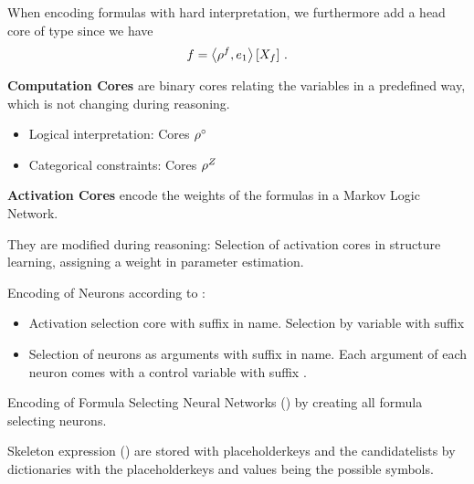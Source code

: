 When encoding formulas with hard interpretation, we furthermore add a head core of type  since we have
 	\[ {f} = \left\langle \rho^{f},e_1\right\rangle \left[ X_{f} \right] \, . \]




\textbf{Computation Cores} are binary cores relating the variables in a predefined way, which is not changing during reasoning.
\begin{itemize}
	\item Logical interpretation: Cores $\rho^{\circ}$ 
	\item Categorical constraints: Cores $\rho^{Z}$
\end{itemize}

\textbf{Activation Cores} encode the weights of the formulas in a Markov Logic Network.

They are modified during reasoning: Selection of activation cores in structure learning, assigning a weight in parameter estimation.




Encoding of Neurons according to :
\begin{itemize}
	\item Activation selection core with suffix  in name.
		 Selection by variable with suffix 
	\item Selection of neurons as arguments with suffix  in name.
		Each argument of each neuron comes with a control variable with suffix .
\end{itemize}

Encoding of Formula Selecting Neural Networks () by creating all formula selecting neurons.

Skeleton expression () are stored with placeholderkeys and the candidatelists by dictionaries with the placeholderkeys and values being the possible symbols.



\label{sec:implementationReasoning}


